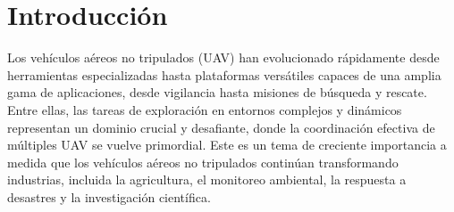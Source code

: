\documentclass[sigconf]{acmart}
\begin{document}
\begin{abstract}
  
	
\end{abstract}


\maketitle

\section{Introducción}

Los vehículos aéreos no tripulados (UAV) han evolucionado rápidamente desde herramientas especializadas hasta plataformas versátiles capaces de una amplia gama de aplicaciones, desde vigilancia hasta misiones de búsqueda y rescate. Entre ellas, las tareas de exploración en entornos complejos y dinámicos representan un dominio crucial y desafiante, donde la coordinación efectiva de múltiples UAV se vuelve primordial. Este es un tema de creciente importancia a medida que los vehículos aéreos no tripulados continúan transformando industrias, incluida la agricultura, el monitoreo ambiental, la respuesta a desastres y la investigación científica.\\
\end{document}
